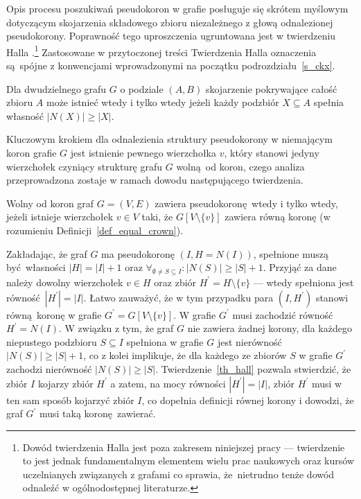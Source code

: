 \par{
  Opis procesu poszukiwań pseudokoron w grafie posługuje się skrótem myślowym dotyczącym skojarzenia składowego zbioru niezależnego z głową odnalezionej pseudokorony. 
  Poprawność tego uproszczenia ugruntowana jest w twierdzeniu Halla .\footnote{Dowód twierdzenia Halla jest poza zakresem niniejszej pracy --- twierdzenie to jest jednak fundamentalnym elementem wielu prac naukowych oraz kursów uczelnianych związanych z grafami co sprawia, że nietrudno tenże dowód odnaleźć w ogólnodostępnej literaturze.}
  Zastosowane w przytoczonej treści Twierdzenia Halla oznaczenia są spójne z konwencjami wprowadzonymi na początku podrozdziału~\ref{s_ckx}.
  \begin{theorem}
    Dla dwudzielnego grafu $G$ o podziale $(A, B)$ skojarzenie pokrywające całość zbioru $A$ może istnieć wtedy i tylko wtedy jeżeli każdy podzbiór $X \subseteq A$ spełnia własność $|N(X)| \geq |X|$.
  \end{theorem}
  Kluczowym krokiem dla odnalezienia struktury pseudokorony w niemającym koron grafie $G$ jest istnienie pewnego wierzchołka $v$, który stanowi jedyny wierzchołek czyniący strukturę grafu $G$ wolną od koron, czego analiza przeprowadzona zostaje w ramach dowodu następującego twierdzenia.
  \begin{theorem}
    Wolny od koron graf $G=(V, E)$ zawiera pseudokoronę wtedy i tylko wtedy, jeżeli istnieje wierzchołek $v \in V$ taki, że $G[V\setminus \{v\}]$ zawiera równą koronę (w rozumieniu Definicji~\ref{def_equal_crown}).
  \end{theorem}
  \begin{bproof}
    Zakładając, że graf $G$ ma pseudokoronę $(I, H=N(I))$, spełnione muszą być własności $|H| = |I| + 1$ oraz $\forall_{\emptyset\neq S \subseteq I}:{|N(S)|\geq|S|+1}$.
    Przyjąć za dane należy dowolny wierzchołek $v \in H$ oraz zbiór $H^\prime=H \setminus \{v\}$ --- wtedy spełniona jest równość $|H^\prime|=|I|$.
    Łatwo zauważyć, że w tym przypadku para $(I, H^\prime)$ stanowi równą koronę w grafie $G^\prime = G[V \setminus \{v\}]$.
    W grafie $G^\prime$ musi zachodzić równość $H^\prime = N(I)$.
    W związku z tym, że graf $G$ nie zawiera żadnej korony, dla każdego niepustego podzbioru $S \subseteq I$ spełniona w grafie $G$ jest nierówność $|N(S)| \geq |S|+1$, co z kolei implikuje, że dla każdego ze zbiorów $S$ w grafie $G^\prime$ zachodzi nierówność $|N(S)| \geq |S|$.
    Twierdzenie~\ref{th_hall} pozwala stwierdzić, że zbiór $I$ kojarzy zbiór $H^\prime$ a zatem, na mocy równości $|H^\prime|=|I|$, zbiór $H^\prime$ musi w ten sam sposób kojarzyć zbiór $I$, co dopełnia definicji równej korony i dowodzi, że graf $G^\prime$ musi taką koronę zawierać.


\end{bproof}}
